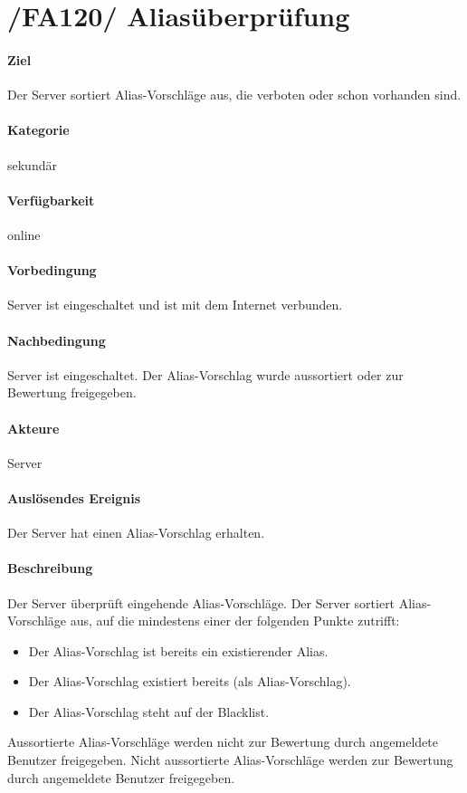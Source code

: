 \section{/FA120/ Aliasüberprüfung}
\label{/FA120/}
\paragraph{Ziel}
Der Server sortiert Alias-Vorschläge aus, die verboten oder schon vorhanden sind.
\paragraph{Kategorie}
sekundär
\paragraph{Verfügbarkeit}
online
\paragraph{Vorbedingung}
Server ist eingeschaltet und ist mit dem Internet verbunden.
\paragraph{Nachbedingung}
Server ist eingeschaltet. Der Alias-Vorschlag wurde aussortiert oder zur Bewertung freigegeben.
\paragraph{Akteure}
Server
\paragraph{Auslösendes Ereignis}
Der Server hat einen Alias-Vorschlag erhalten.
\paragraph{Beschreibung}
Der Server überprüft eingehende Alias-Vorschläge. Der Server sortiert Alias-Vorschläge aus, auf die mindestens einer der folgenden Punkte zutrifft:
\begin{itemize}
    \item Der Alias-Vorschlag ist bereits ein existierender Alias.
    \item Der Alias-Vorschlag existiert bereits (als Alias-Vorschlag).
    \item Der Alias-Vorschlag steht auf der Blacklist.
\end{itemize}
Aussortierte Alias-Vorschläge werden nicht zur Bewertung durch angemeldete Benutzer freigegeben. Nicht aussortierte Alias-Vorschläge werden zur Bewertung durch angemeldete Benutzer freigegeben.
